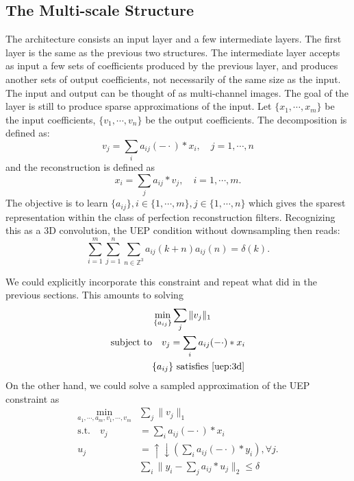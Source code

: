 \documentclass[a4paper]{article}
\begin{document}
\subsection{The Multi-scale Structure}
The architecture consists an input layer and a few intermediate layers. The first layer is the same as the previous two structures. The intermediate layer accepts as input a few sets of coefficients produced by the previous layer, and produces another sets of output coefficients, not necessarily of the same size as the input. The input and output can be thought of as multi-channel images. The goal of the layer is still to produce sparse approximations of the input. Let $\{x_1,\cdots,x_m\}$ be the input coefficients, $\{v_1,\cdots,v_n\}$ be the output coefficients. The decomposition is defined as:
\begin{equation}
v_j = \sum_i a_{ij}(-\cdot)*x_i,\quad j=1,\cdots,n
\end{equation}
and the reconstruction is defined as 
\begin{equation}
x_i = \sum_j a_{ij}*v_j, \quad i=1,\cdots, m.
\end{equation}
The objective is to learn $\{a_{ij}\}, i\in \{1,\cdots,m\}, j\in \{1,\cdots, n\}$ which gives the sparest representation within the class of perfection reconstruction filters. Recognizing this as a 3D convolution, the UEP condition without downsampling then reads:
\begin{equation}
\label{uep:3d}
\sum_{i=1}^m\sum_{j=1}^n  \sum_{n\in \mathbb{Z}^3} a_{ij}(k+n)a_{ij}(n) = \delta(k).
\end{equation}

We could explicitly incorporate this constraint and repeat what did in the previous sections. This amounts to solving
\begin{equation}
\begin{aligned}
	&\min_{ \{a_{ij}\} } \sum_j \|v_j\|_1 \\
	\textrm{subject to} &\quad v_j = \sum_i a_{ij}(-\cdot)*x_i \\
		&\{a_{ij}\} \textrm{ satisfies \eqref{uep:3d}} \\
\end{aligned}
\end{equation}
On the other hand, we could solve a sampled approximation of the UEP constraint as
\begin{equation}
\label{eq:m3}
\begin{aligned}
\min_{a_1,\cdots,a_m, v_1,\cdots,v_m}& \sum_j \|v_j\|_1 \\
 \textrm{s.t.}  \quad v_j& = \sum_{i} a_{ij}(-\cdot)*x_i \\
	u_j&=\uparrow\downarrow(\sum_i a_{ij}(-\cdot)*y_i), \forall j. \\
	&\sum_i \|y_i - \sum_j a_{ij}*u_j\|_2 \leq \delta 
\end{aligned}
\end{equation}
\end{document}
